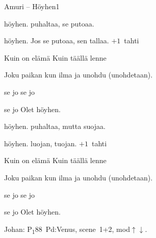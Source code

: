 \documentclass[12pt,a4paper]{article}
\begin{document}
\thispagestyle{empty}
\begin{mysong}{Amuri – Höyhen}{1}


\begin{SBVerse}
   höyhen.  puhaltaa,  se putoaa.

   höyhen. Jos se  putoaa,  sen
  tallaa. {\SBLyricNoteFont $+1$~tahti}
\end{SBVerse}

\begin{SBChorus}
  Kuin  on elämä  Kuin  täällä
  lenne

  Joku  paikan  kun ilma  ja
  unohdu (unohdetaan).

     se jo 
     se jo 

     se jo  Olet
  höyhen.
\end{SBChorus}


\begin{SBVerse}
   höyhen.  puhaltaa, mutta 
  suojaa.

   höyhen.  luojan,  tuojan.
  {\SBLyricNoteFont $+1$~tahti}
\end{SBVerse}

\begin{SBChorus}
  Kuin  on elämä  Kuin  täällä
  lenne

  Joku  paikan  kun ilma  ja
  unohdu (unohdetaan).

     se jo 
     se jo 

     se jo  Olet
  höyhen.
\end{SBChorus}


{\SBLyricNoteFont Johan: P\textsubscript{1}88~Pd:Venus, scene~1+2,
mod$\uparrow\downarrow$.}

\end{mysong}
\end{document}
